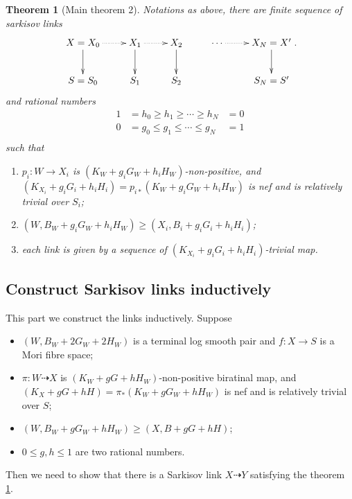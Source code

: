 \documentclass{article}
\newtheorem{thm}[defn]{Theorem}
\begin{document}
\begin{thm}[Main theorem 2]\label{maintheorem2}
Notations as above, there are finite sequence of sarkisov links
\[
  \xymatrix{
    X=X_0\ar@{.>}[r]\ar[d]&X_{1}\ar@{.>}[r]\ar[d]& X_{2}\ar[d] &\cdots\ar@{.>}[r]&X_N=X'\ar[d] \\
    S=S_{0}&S_{1} &S_{2}&&S_N=S'
  }
.\]
and rational numbers
\[
  \begin{aligned}
    1&=h_0\geqslant h_1 \geqslant \cdots \geqslant h_N&=0\\
    0&=g_0\leqslant g_1 \leqslant \cdots \leqslant g_N&=1\\
  \end{aligned}
\]
such that 
\begin{enumerate}
  \item $p_i:W\to X_{i}$ is $(K_{W}+g_{i}G_{W}+h_{i}H_{W})$-non-positive, and $(K_{X_{i}}+g_{i}G_{i}+h_{i}H_{i})=p_{i*}(K_{W}+g_{i}G_{W}+h_{i}H_{W})$ is nef and is relatively trivial over $S_{i}$;
  \item $(W,B_{W}+g_{i}G_{W}+h_{i}H_{W})\geqslant (X_{i},B_{i}+g_{i}G_{i}+h_{i}H_{i})$;
  \item each link is given by a sequence of $(K_{X_{i}}+g_{i}G_{i}+h_{i}H_{i})$-trivial map.
\end{enumerate}
\end{thm}

\subsection{Construct Sarkisov links inductively}
This part we construct the links inductively. Suppose 
\begin{itemize}
  \item $(W,B_{W}+2G_{W}+2H_{W})$ is a terminal log smooth pair and $f:X\to S$ is a Mori fibre space;
  \item $\pi:W\dashrightarrow  X$ is $(K_{W}+gG+hH_{W})$-non-positive biratinal map, and $(K_{X}+gG+hH)=\pi_{*}(K_{W}+gG_{W}+hH_{W})$ is nef and is relatively trivial over $S$;
  \item $(W,B_{W}+gG_{W}+hH_{W})\geqslant (X,B+gG+hH)$;
  \item $0\leqslant g,h\leqslant 1$ are two rational numbers.
\end{itemize}
Then we need to show that there is a Sarkisov link $X\dashrightarrow Y$ satisfying the theorem \ref{maintheorem2}.
\end{document}
